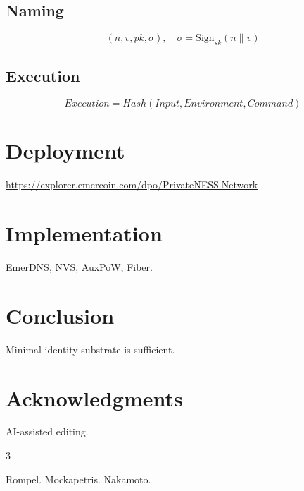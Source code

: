 \documentclass[11pt,a4paper]{article}
\begin{document}
\subsection{Naming}

\begin{equation}
(n, v, pk, \sigma), \quad \sigma = \text{Sign}_{sk}(n \parallel v)
\end{equation}

\subsection{Execution}

\begin{equation}
Execution = Hash(Input, Environment, Command)
\end{equation}

\section{Deployment}

\url{https://explorer.emercoin.com/dpo/PrivateNESS.Network}

\section{Implementation}

EmerDNS, NVS, AuxPoW, Fiber.

\section{Conclusion}

Minimal identity substrate is sufficient.

\section*{Acknowledgments}

AI-assisted editing.

\begin{thebibliography}{3}

 Rompel.
 Mockapetris.
 Nakamoto.

\end{thebibliography}
\end{document}

